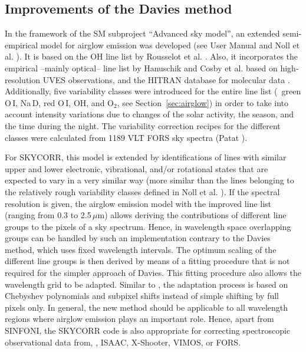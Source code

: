 \subsection{Improvements of the Davies method}
\label{sec:improvements}
In the framework of the SM subproject ``Advanced sky model'', an extended
semi-empirical model for airglow emission was developed (see \cite{SM01} User
Manual and Noll et al. \cite{NOL12}). It is based on the OH line list by
Rousselot et al. \cite{ROU00}. Also, it incorporates the empirical
--mainly optical-- line list by Hanuschik \cite{HAN03} and Cosby et al.
\cite{COS06} based on high-resolution UVES observations, and the HITRAN
database for molecular data \cite{HITRAN}. Additionally, five variability
classes were introduced for the entire line list (\ie\ green O\,I, Na\,D, red
O\,I, OH, and O$_2$, see Section~\ref{sec:airglow}) in order to take into
account intensity variations due to changes of the solar activity, the season,
and the time during the night. The variability correction recipes for the
different classes were calculated from 1189 VLT FORS sky spectra (Patat
\cite{PAT08}).

For SKYCORR, this model is extended by identifications of lines with similar
upper and lower electronic, vibrational, and/or rotational states that are
expected to vary in a very similar way (more similar than the lines belonging
to the relatively rough variability classes defined in Noll et al.
\cite{NOL12}). If the spectral resolution is given, the airglow emission
model with the improved line list (ranging from 0.3 to 2.5\,$\mu$m) allows
deriving the contributions of different line groups to the pixels of a sky
spectrum. Hence, in wavelength space overlapping groups can be handled by such
an implementation contrary to the Davies method, which uses fixed wavelength
intervals. The optimum scaling of the different line groups is then derived by
means of a fitting procedure that is not required for the simpler approach of
Davies. This fitting procedure also allows the wavelength grid to be adapted.
Similar to \cite{MOLECFIT}, the adaptation process is based on Chebyshev
polynomials and subpixel shifts instead of simple shifting by full pixels only.
In general, the new method should be applicable to all wavelength regions where
airglow emission plays an important role. Hence, apart from SINFONI, the
SKYCORR code is also appropriate for correcting spectroscopic observational
data from, \eg, ISAAC, X-Shooter, VIMOS, or FORS.


